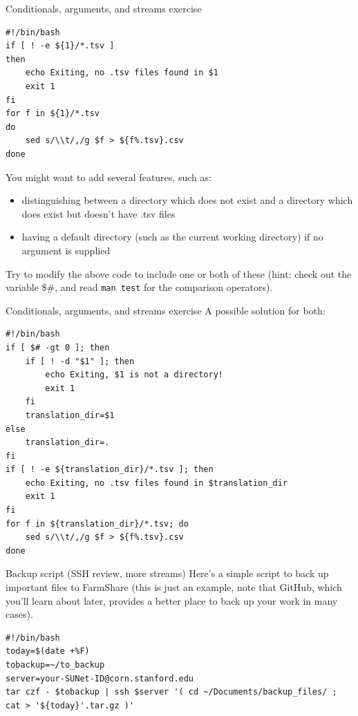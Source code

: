\documentclass{beamer}
\begin{document}
\begin{frame}[fragile]{Conditionals, arguments, and streams exercise}
\begin{lstlisting}[basicstyle=\small]
#!/bin/bash
if [ ! -e ${1}/*.tsv ]
then
    echo Exiting, no .tsv files found in $1
    exit 1
fi 
for f in ${1}/*.tsv
do
    sed s/\\t/,/g $f > ${f%.tsv}.csv
done
\end{lstlisting}
You might want to add several features, such as: 
\begin{itemize}
\item distinguishing between a directory which does not exist and a directory which does exist but doesn't have .tsv files
\item having a default directory (such as the current working directory) if no argument is supplied
\end{itemize}
Try to modify the above code to include one or both of these (hint: check out the variable \$\#, and read \lstinline|man test| for the comparison operators). 
\end{frame}

\begin{frame}[fragile]{Conditionals, arguments, and streams exercise}
A possible solution for both:
\begin{lstlisting}[basicstyle=\small]
#!/bin/bash
if [ $# -gt 0 ]; then
    if [ ! -d "$1" ]; then
        echo Exiting, $1 is not a directory!
        exit 1
    fi
    translation_dir=$1
else
    translation_dir=.
fi
if [ ! -e ${translation_dir}/*.tsv ]; then
    echo Exiting, no .tsv files found in $translation_dir
    exit 1
fi 
for f in ${translation_dir}/*.tsv; do
    sed s/\\t/,/g $f > ${f%.tsv}.csv
done
\end{lstlisting}
\end{frame}

\begin{frame}[fragile]{Backup script (SSH review, more streams)}
Here's a simple script to back up important files to FarmShare (this is just an example, note that GitHub, which you'll learn about later, provides a better place to back up your work in many cases). 
\begin{lstlisting}[title=backup.sh]
#!/bin/bash
today=$(date +%F)
tobackup=~/to_backup
server=your-SUNet-ID@corn.stanford.edu
tar czf - $tobackup | ssh $server '( cd ~/Documents/backup_files/ ; cat > '${today}'.tar.gz )'
\end{lstlisting}
\end{frame}
\end{document}

